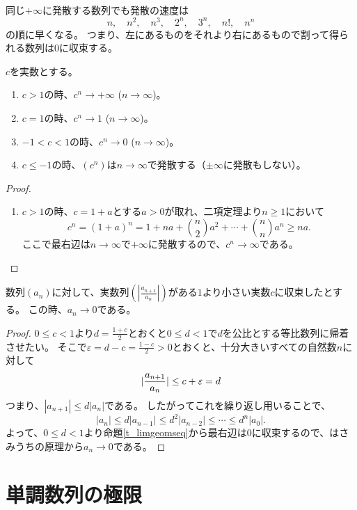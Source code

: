 同じ$+\infty$に発散する数列でも発散の速度は
$$
n, \quad n^2, \quad n^3, \quad 2^n, \quad 3^n, \quad n!, \quad n^n
$$
の順に早くなる。
つまり、左にあるものをそれより右にあるもので割って得られる数列は$0$に収束する。

\begin{proposition}[等比数列の極限]
\label{t_limgeomseq}
$c$を実数とする。
\begin{enumerate}
\item
$c > 1$の時、$c^n \to +\infty$ ($n \to \infty$)。
\item
$c = 1$の時、$c^n \to 1$ ($n \to \infty$)。
\item
$-1 < c < 1$の時、$c^n \to 0$ ($n \to \infty$)。
\item
$c \le -1$の時、$(c^n)$は$n \to \infty$で発散する（$\pm \infty$に発散もしない）。
\end{enumerate}
\end{proposition}

\begin{proof}
\begin{enumerate}
\item
$c > 1$の時、$c = 1+a$とする$a > 0$が取れ、二項定理より$n \ge 1$において
$$
c^n = (1+a)^n = 1+n a+\binom{n}{2}a^2+\cdots+\binom{n}{n}a^n \ge n a.
$$
ここで最右辺は$n \to \infty$で$+\infty$に発散するので、$c^n \to \infty$である。
\end{enumerate}
\end{proof}

\begin{proposition}
数列$(a_n)$に対して、実数列$(|\frac{a_{n+1}}{a_n}|)$がある$1$より小さい実数$c$に収束したとする。
この時、$a_n \to 0$である。
\end{proposition}

\begin{proof}
$0 \le c < 1$より$d = \frac{1+c}{2}$とおくと$0 \le d < 1$で$d$を公比とする等比数列に帰着させたい。
そこで$\varepsilon = d-c = \frac{1-c}{2} > 0$とおくと、十分大きいすべての自然数$n$に対して
$$
\lvert\frac{a_{n+1}}{a_n}\rvert \le c+\varepsilon = d
$$
つまり、$|a_{n+1}| \le d|a_n|$である。
したがってこれを繰り返し用いることで、
$$
|a_n| \le d|a_{n-1}| \le d^2|a_{n-2}| \le \cdots \le d^n|a_0|.
$$
よって、$0 \le d < 1$より命題\ref{t_limgeomseq}から最右辺は$0$に収束するので、はさみうちの原理から$a_n \to 0$である。
\end{proof}

\section{単調数列の極限}

